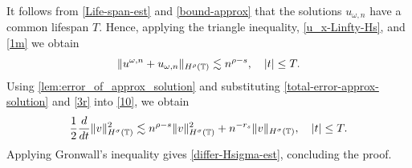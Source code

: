 %
%
It follows from \eqref{Life-span-est} and 
\eqref{bound-approx} that the solutions $u_{\omega,n}$ have a common 
lifespan $T$. Hence, applying the triangle inequality, 
\eqref{u_x-Linfty-Hs}, and \eqref{1m} we obtain  
%
%
\begin{equation}
	\|u^{\omega,n} + u_{\omega,n}\|_{H^\rho(\mathbb{T})} \lesssim n^{\rho -s}, 
	\quad |t| \le T.
\label{3r}
\end{equation}
%
%
%
%
%
%
Using \cref{lem:error_of_approx_solution} and
substituting \eqref{total-error-approx-solution} and \eqref{3r}
into \eqref{10}, we obtain
%
%
\begin{equation}
\begin{split}
\frac{1}{2}\frac{d}{dt}\|v\|_{H^\sigma(\mathbb{T})}^2 \lesssim n^{\rho - s}
\|v\|_{H^\sigma(\mathbb{T})}^2 + n^{-r_s}\|v\|_{H^\sigma(\mathbb{T})}, \quad |t| \le T.
\label{200r}
\end{split}
\end{equation}
%
%
Applying Gronwall's inequality gives \eqref{differ-Hsigma-est}, concluding 
the proof. \qquad \qedsymbol
%
%
%
%
%
%
%

